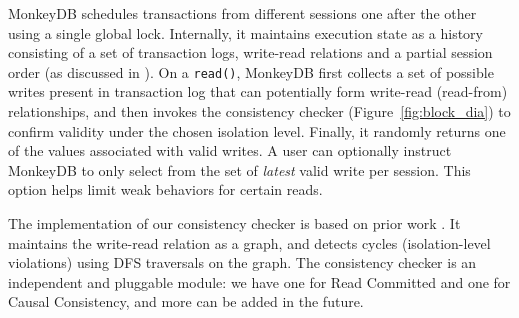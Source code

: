 MonkeyDB schedules transactions from different sessions
one after the other using a single global lock.
Internally, it maintains execution state as a history consisting of a set of transaction logs, 
write-read relations and a partial session order (as discussed in ).
On a {\tt read()}, MonkeyDB first collects a set of possible writes present in transaction log 
that can potentially form write-read (read-from) relationships, and then 
invokes the consistency checker (Figure~\ref{fig:block_dia}) to confirm
validity under the chosen isolation level.
Finally, it randomly returns one of the values associated with valid writes.
A user can optionally instruct MonkeyDB to only select
from the set of \textit{latest} valid write per session. This option helps limit weak behaviors
for certain reads.


The implementation of our consistency checker is based on prior work
\cite{DBLP:journals/pacmpl/BiswasE19}. It maintains 
the write-read relation as a graph, and detects cycles (isolation-level
violations) using DFS traversals on the graph. The consistency checker is an independent 
and pluggable module: we have one for Read Committed and one for Causal
Consistency, and more can be added in the future.





